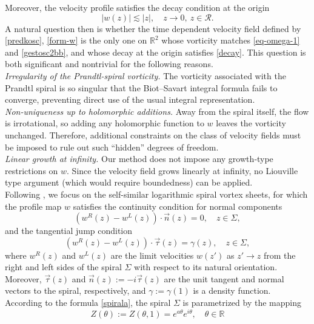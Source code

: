 \documentclass[11pt, letterpaper, reqno]{amsart}
\numberwithin{equation}{section}
\theoremstyle{definition}
\theoremstyle{plain}
\numberwithin{equation}{section}
\def\R{\mathbb{R}}
\def\RR{\mathcal{R}}
\begin{document}
Moreover, the velocity profile satisfies the decay condition at the origin
\begin{equation}\label{decay}
|w(z)| \lesssim |z|, \quad z\to 0, \ z\in\RR.
\end{equation}
A natural question then is whether the time dependent velocity field defined by \eqref{predkosc}, \eqref{form-w} is the only one on $\R^{2}$ whose vorticity matches \eqref{eq-omega-1} and \eqref{gestosc2bb}, and whose decay at the origin satisfies \eqref{decay}. This question is both significant and nontrivial for the following reasons. \\[3pt]
{\em Irregularity of the Prandtl-spiral vorticity.} 
The vorticity associated with the Prandtl spiral is so singular that the Biot–Savart integral formula fails to converge, preventing direct use of the usual integral representation. \\[3pt]
{\em Non-uniqueness up to holomorphic additions.}
Away from the spiral itself, the flow is irrotational, so adding any holomorphic function to $w$ leaves the vorticity unchanged. Therefore, additional constraints on the class of velocity fields must be imposed to rule out such ``hidden'' degrees of freedom. \\[3pt]
{\em Linear growth at infinity.}
Our method does not impose any growth‐type restrictions on $w$. Since the velocity field grows linearly at infinity, no Liouville type argument (which would require boundedness) can be applied. \\[3pt]
\indent Following \cite{CKO}, we focus on the self-similar logarithmic spiral vortex sheets, for which the profile map $w$ satisfies the continuity condition for normal components
\begin{equation}\label{skoki-nor}
(w^R(z)-w^L(z))\cdot \vec{n}(z) = 0, \quad z\in \Sigma,
\end{equation} 
and the tangential jump condition 
\begin{equation}\label{skoki-tan}
(w^R(z)-w^L(z))\cdot\vec{\tau}(z) = \gamma(z), \quad z\in \Sigma, 
\end{equation}
where $w^{R}(z)$ and $w^{L}(z)$ are the limit velocities $w(z')$ as $z'\to z$ from the right and left sides of the spiral $\Sigma$ with respect to its natural orientation. Moreover, $\vec{\tau}(z)$ and $\vec{n}(z) := -i\vec{\tau}(z)$ are the unit tangent and normal vectors to the spiral, respectively, and $\gamma:=\gamma(1)$ is a density function. According to the formula \eqref{spirala}, the spiral $\Sigma$ is parametrized by the mapping
\begin{equation*}
Z(\theta):=Z(\theta,1) = e^{a\theta}e^{i\theta}, \quad \theta \in \mathbb{R}
\end{equation*}
\end{document}
